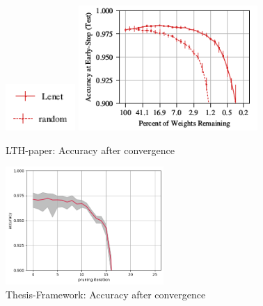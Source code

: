 \begin{figure}
	\begin{minipage}{\textwidth}
		\centering
		\includegraphics[width=100px]{gfx/7-Evaluation/LTH_3_legend.png}
	\end{minipage}
	\begin{minipage}{0.5\textwidth}
		\centering
		\includegraphics[height=180px]{gfx/7-Evaluation/LTH_0.png}
		\caption*{LTH-paper: Accuracy after convergence}
		\label{?}
	\end{minipage}\hfill
	\begin{minipage}{0.5\textwidth}
		\centering
		\includegraphics[height=170px]{gfx/Experiments/Reproduction-MNIST-FCN/accuracy/converged.png}
		\caption*{Thesis-Framework: Accuracy after convergence}
		\label{?}
	\end{minipage}
\end{figure}
